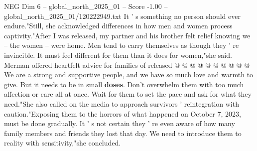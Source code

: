 \begin{textsample}{NEG Dim 6 – global\_north\_2025\_01 – Score -1.00 – global\_north\_2025\_01/120222949.txt}
It ' s something no person should ever endure."Still, she acknowledged differences in how men and women process captivity."After I was released, my partner and his brother felt relief knowing we -- the women -- were home.
Men tend to carry themselves as though they ' re invincible.
It must feel different for them than it does for women,"she said.
Merman offered heartfelt advice for families of released @ @ @ @ @ @ @ @ @ @ We are a strong and supportive people, and we have so much love and warmth to give.
But it needs to be in small \textbf{doses}.
Don't overwhelm them with too much affection or care all at once.
Wait for them to set the pace and ask for what they need."She also called on the media to approach survivors ' reintegration with caution."Exposing them to the horrors of what happened on October 7, 2023, must be done gradually.
It ' s not certain they ' re even aware of how many family members and friends they lost that day.
We need to introduce them to reality with sensitivity,"she concluded.

\end{textsample}
